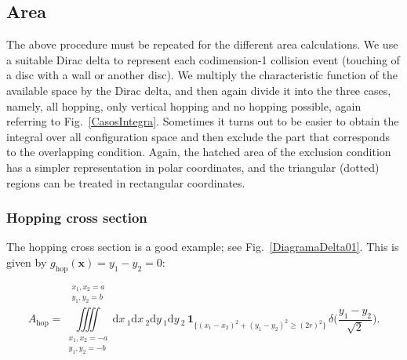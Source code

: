 \documentclass[superscriptaddress,pre,reprint,showpacs,twocolumn]{revtex4-1}
\newcommand{\rd}[1]{\mathrm{d}{#1} \,}
\newcommand{\indicatorsymbol}{\mathbf{1}}
\newcommand{\indicator}[1]{\indicatorsymbol_{ \{   #1 \} } }
\begin{document}
\subsection{Area}

The above procedure must be repeated for the different
area calculations. We use a suitable Dirac delta to represent each codimension-1 collision
event (touching of a disc with a wall or another disc). We multiply the characteristic function of the available space by the Dirac delta, and
then again divide it into the three cases, namely, all hopping, only vertical hopping
and no hopping possible, again referring to Fig.~\ref{CasosIntegra}.
Sometimes it turns out to be easier to obtain 
the integral  over all configuration space and then exclude the part that
corresponds to the overlapping condition. Again, the hatched area of the exclusion
condition has a simpler representation in polar coordinates, and the triangular
(dotted) regions can be treated in rectangular coordinates.
%

\subsubsection{Hopping cross section}

The hopping cross section is a good example; see Fig.~\ref{DiagramaDelta01}. 
This is given by $g_\text{hop}(\mathbf{x}) = y_1 - y_2 = 0$:

\begin{widetext}\label{ahopcart}
\begin{equation}
  A_\text{hop} =
\iiiint
\limits_{\substack{x_1, x_2 = -a \\ y_1, y_2 = -b}}^{\substack{x_1, x_2 = a \\ y_1, y_2 = b}}
\rd x_1 \rd x_2 \rd y_1 \rd y_2 
 \, \indicator{ (x_1-x_2)^2 + (y_1-y_2)^2 \ge (2r)^2 } \, \delta \big(\frac{y_1-y_2}{\sqrt{2}}\big).
\end{equation}
\end{widetext}
\end{document}
